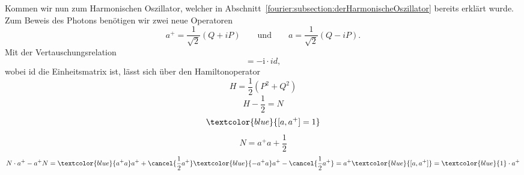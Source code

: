 Kommen wir nun zum Harmonischen Oszillator, welcher in Abschnitt~\ref{fourier:subsection:derHarmonischeOszillator} bereits erklärt wurde.
Zum Beweis des Photons benötigen wir zwei neue Operatoren
\[
a^{+} = \frac{1}{\sqrt{2}}(Q + iP)
\qquad\text{und}\qquad
a = \frac{1}{\sqrt{2}}(Q - iP).
\]
Mit der Vertauschungsrelation
\begin{equation}
	[P,Q] = -\mathrm{i} \cdot id,
\end{equation}
wobei id die Einheitsmatrix ist, lässt sich über den Hamiltonoperator %
\begin{equation}
	H = \frac{1}{2}(P^2+Q^2)
\end{equation}
\begin{equation}
	H - \frac{1}{2} = N
\end{equation}
\begin{equation}
	\textcolor{blue}{[a, a^+] = 1}
\end{equation}
\begin{equation}
	N = a^+a + \frac{1}{2}
\end{equation}
\begin{equation}
	N\cdot a^+ - a^+N 
	= \textcolor{blue}{a^+a}a^+ + \cancel{\frac{1}{2}a^+} \textcolor{blue}{-a^+a}a^+ - \cancel{\frac{1}{2}a^+}
	= a^+\textcolor{blue}{[a, a^+]} 
	= \textcolor{blue}{1}\cdot a^+
\end{equation}
